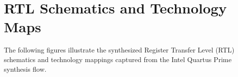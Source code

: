 \appendix
\section{RTL Schematics and Technology Maps}

The following figures illustrate the synthesized Register Transfer Level (RTL) schematics and technology mappings captured from the Intel Quartus Prime synthesis flow.




